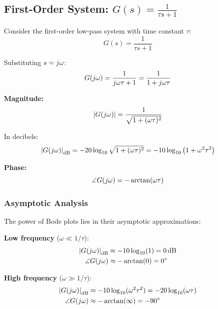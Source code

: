 \subsection{First-Order System: $G(s) = \frac{1}{\tau s + 1}$}

Consider the first-order low-pass system with time constant $\tau$:
\begin{equation}
G(s) = \frac{1}{\tau s + 1}
\label{eq:first_order}
\end{equation}

Substituting $s = j\omega$:
\begin{equation}
G(j\omega) = \frac{1}{j\omega\tau + 1} = \frac{1}{1 + j\omega\tau}
\label{eq:first_order_jw}
\end{equation}

\textbf{Magnitude:}
\begin{equation}
\left|G(j\omega)\right| = \frac{1}{\sqrt{1 + (\omega\tau)^2}}
\label{eq:first_order_mag}
\end{equation}

In decibels:
\begin{equation}
\left|G(j\omega)\right|_{\text{dB}} = -20\log_{10}\sqrt{1 + (\omega\tau)^2} = -10\log_{10}\left(1 + \omega^2\tau^2\right)
\label{eq:first_order_db}
\end{equation}

\textbf{Phase:}
\begin{equation}
\angle G(j\omega) = -\arctan(\omega\tau)
\label{eq:first_order_phase}
\end{equation}

\subsubsection{Asymptotic Analysis}

The power of Bode plots lies in their asymptotic approximations:

\textbf{Low frequency} ($\omega \ll 1/\tau$):
\begin{align}
\left|G(j\omega)\right|_{\text{dB}} &\approx -10\log_{10}(1) = 0\,\text{dB} \\
\angle G(j\omega) &\approx -\arctan(0) = 0^\circ
\end{align}

\textbf{High frequency} ($\omega \gg 1/\tau$):
\begin{align}
\left|G(j\omega)\right|_{\text{dB}} &\approx -10\log_{10}(\omega^2\tau^2) = -20\log_{10}(\omega\tau) \\
\angle G(j\omega) &\approx -\arctan(\infty) = -90^\circ
\end{align}

